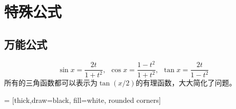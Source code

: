\section{特殊公式}

\subsection{万能公式}

\begin{theorem}[万能公式]
    $$\sin x = \frac{2t}{1+t^2},\ \ \cos x = \frac{1-t^2}{1+t^2},\ \ \tan x = \frac{2t}{1-t^2}$$
    所有的三角函数都可以表示为$\tan(x/2)$的有理函数，大大简化了问题。
\end{theorem}

\def\scala{2.5}
=
[thick,draw=black, fill=white, rounded corners]

